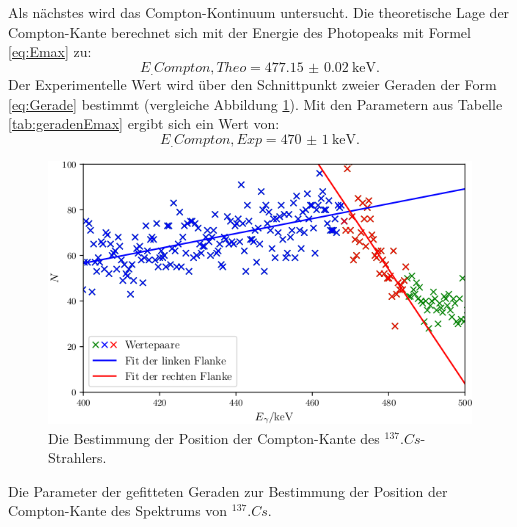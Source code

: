 \newpage
\noindent Als nächstes wird das Compton-Kontinuum untersucht. Die theoretische Lage der Compton-Kante berechnet sich mit der Energie des Photopeaks mit Formel \eqref{eq:Emax} zu:
\[
E_.{Compton,Theo} = \SI{477.15(2)}{\kilo\electronvolt}\text{.}
\]
Der Experimentelle Wert wird über den Schnittpunkt zweier Geraden der Form \eqref{eq:Gerade} bestimmt (vergleiche  Abbildung \ref{fig:Emax}). Mit den Parametern aus Tabelle \ref{tab:geradenEmax} ergibt sich ein Wert von:
\[
E_.{Compton,Exp} = \SI{470(1)}{\kilo\electronvolt}\text{.}
\]

\begin{figure}
	\centering
	\includegraphics[width=\linewidth-70pt,height=\textheight-70pt,keepaspectratio]{content/images/Cs137Emax.png}
	\caption{Die Bestimmung der Position der Compton-Kante des $^{137}.{Cs}$-Strahlers.}
	\label{fig:Emax}
\end{figure}

\begin{table}
	\centering
	\caption{Die Parameter der gefitteten Geraden zur Bestimmung der Position der Compton-Kante des Spektrums von $^{137}.{Cs}$.}
	
	\label{tab:geradenEmax}
\end{table}

